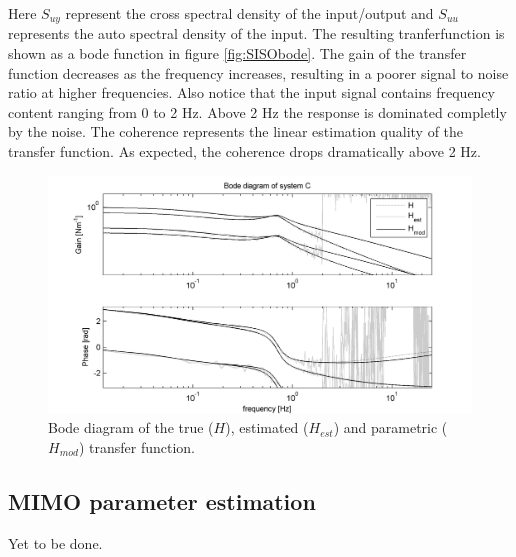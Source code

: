 Here $S_{uy}$ represent the cross spectral density of the input/output and $S_{uu}$ represents the auto spectral density of the input. The resulting tranferfunction is shown as a bode function in figure \ref{fig:SISObode}. The gain of the transfer function decreases as the frequency increases, resulting in a poorer signal to noise ratio at higher frequencies. Also notice that the input signal contains frequency content ranging from 0 to 2 Hz. Above 2 Hz the response is dominated completly by the noise. The coherence represents the linear estimation quality of the transfer function. As expected, the coherence drops dramatically above 2 Hz.
	\begin{figure}
		\includegraphics{images/MIMObode}
		\caption{Bode diagram of the true ($H$), estimated ($H_{est}$) and parametric ($H_{mod}$) transfer function.}
				\label{fig:MIMObode}
	\end{figure}
	\subsection{MIMO parameter estimation}
	Yet to be done.